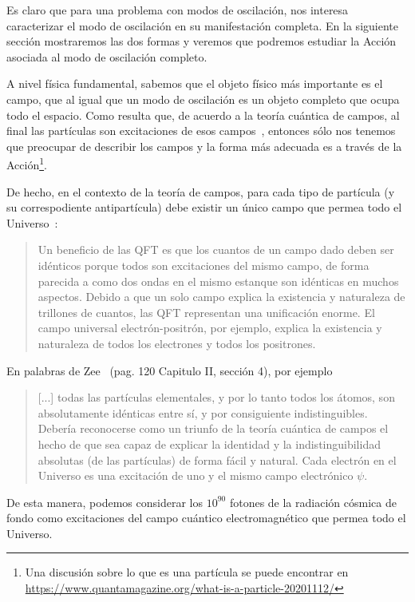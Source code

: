 Es claro que para una problema con modos de oscilación, nos interesa caracterizar el modo de oscilación en su manifestación completa. En la siguiente sección mostraremos las dos formas y veremos que  podremos  estudiar la Acción asociada al modo de oscilación completo.

A nivel física fundamental, sabemos que el objeto físico más importante es el campo, que al igual que un modo de oscilación es un objeto completo que ocupa todo el espacio.
Como resulta que, de acuerdo a la teoría cuántica de campos,  al final las partículas son excitaciones de esos campos~\cite{Hobson:2013hca}, entonces sólo nos tenemos que preocupar de describir los campos y la forma más adecuada es
a través de la Acción\footnote{Una discusión sobre lo que es una partícula se puede encontrar en \url{https://www.quantamagazine.org/what-is-a-particle-20201112/}}.

\begin{frame}
De hecho, en el contexto de la teoría de campos, para cada tipo de partícula (y su correspodiente antipartícula) debe existir un único campo que permea todo el Universo~\cite{Hobson:2013hca}:
\begin{quote}
  Un beneficio de las QFT es que los cuantos de un campo dado deben ser idénticos porque todos son excitaciones del mismo campo, de forma parecida a como dos ondas en el mismo estanque son idénticas en muchos aspectos. Debido a que un solo campo explica la existencia y naturaleza de trillones de cuantos, las QFT representan una unificación enorme. El campo universal electrón-positrón, por ejemplo, explica la existencia y naturaleza de todos los electrones y todos los positrones.
\end{quote}

En palabras de Zee~\cite{Zee:2010qce} (pag. 120 Capitulo II, sección 4), por ejemplo
\begin{quote}
  [...] todas las partículas elementales, y por lo tanto todos los átomos, son absolutamente idénticas entre sí, y por consiguiente indistinguibles. Debería  reconocerse como un triunfo de la teoría cuántica de campos el hecho de que sea capaz de explicar la identidad y la indistinguibilidad absolutas (de las partículas) de forma fácil y natural.
  Cada electrón en el Universo es una excitación de uno y el mismo campo electrónico $\psi$.
\end{quote}
De esta manera, podemos considerar los $10^{90}$ fotones de la radiación cósmica de fondo como excitaciones del campo cuántico electromagnético que permea todo el Universo.
\end{frame}


